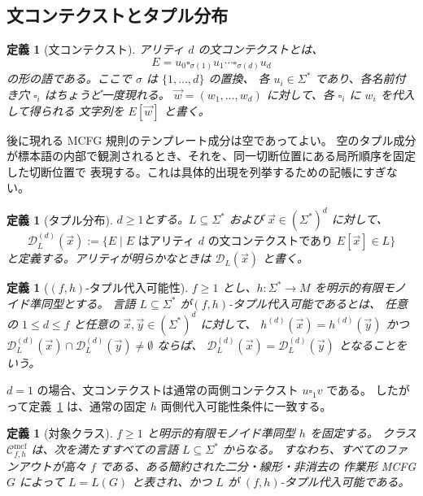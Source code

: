 \documentclass[11pt,a4paper]{ltjsarticle}
\newtheorem{definition}[theorem]{定義}
\theoremstyle{remark}
\newcommand{\Cmcf}[2]{\mathcal{C}^{\mathrm{mcf}}_{#1,#2}}
\newcommand{\D}{\mathcal{D}}
\newcommand{\tuple}[1]{\vec{#1}}
\newcommand{\blank}{\square}
\begin{document}
\subsection{文コンテクストとタプル分布}

\begin{definition}[文コンテクスト]
\label{def:sentence-context}
\emph{アリティ \(d\) の文コンテクスト}とは、
\[
  E=u_0\blank_{\sigma(1)}u_1\cdots\blank_{\sigma(d)}u_d
\]
の形の語である。ここで \(\sigma\) は \(\{1,\ldots,d\}\) の置換、
各 \(u_i\in\Sigma^*\) であり、各名前付き穴 \(\blank_i\) はちょうど一度現れる。
\(\tuple w=(w_1,\ldots,w_d)\) に対して、各 \(\blank_i\) に \(w_i\) を代入して得られる
文字列を \(E[\tuple w]\) と書く。
\end{definition}

後に現れる MCFG 規則のテンプレート成分は空であってよい。
空のタプル成分が標本語の内部で観測されるとき、それを、同一切断位置にある局所順序を固定した切断位置で
表現する。これは具体的出現を列挙するための記帳にすぎない。

\begin{definition}[タプル分布]
\label{def:tuple-distribution}
\(d\geq1\)とする。\(L\subseteq\Sigma^*\) および \(\tuple x\in(\Sigma^*)^d\) に対して、
\[
\D_L^{(d)}(\tuple x):=
\{E\mid E\text{ はアリティ }d\text{ の文コンテクストであり }E[\tuple x]\in L\}
\]
と定義する。アリティが明らかなときは \(\D_L(\tuple x)\) と書く。
\end{definition}

\begin{definition}[\((f,h)\)-タプル代入可能性]
\label{def:tuple-substitutable}
\(f\ge1\) とし、\(h\colon\Sigma^*\to M\) を明示的有限モノイド準同型とする。
言語 \(L\subseteq\Sigma^*\) が\emph{\((f,h)\)-タプル代入可能}であるとは、
任意の \(1\le d\le f\) と任意の
\(\tuple x,\tuple y\in(\Sigma^*)^d\) に対して、
\(h^{(d)}(\tuple x)=h^{(d)}(\tuple y)\) かつ
\(\D_L^{(d)}(\tuple x)\cap\D_L^{(d)}(\tuple y)\ne\emptyset\) ならば、
\(\D_L^{(d)}(\tuple x)=\D_L^{(d)}(\tuple y)\) となることをいう。
\end{definition}

\(d=1\) の場合、文コンテクストは通常の両側コンテクスト \(u\blank_1v\) である。
したがって定義~\ref{def:tuple-substitutable} は、通常の固定 \(h\) 両側代入可能性条件に一致する。

\begin{definition}[対象クラス]
\label{def:class-cmcf}
\(f\ge1\) と明示的有限モノイド準同型 \(h\) を固定する。
クラス \(\Cmcf{f}{h}\) は、次を満たすすべての言語 \(L\subseteq\Sigma^*\) からなる。
すなわち、すべてのファンアウトが高々 \(f\) である、ある簡約された二分・線形・非消去の
作業形 MCFG \(G\) によって \(L=L(G)\) と表され、かつ \(L\) が
\((f,h)\)-タプル代入可能である。
\end{definition}
\end{document}
